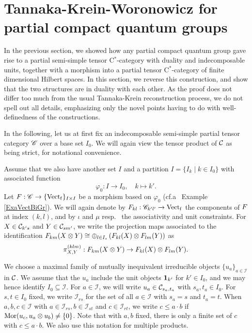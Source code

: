 \section{Tannaka-Krein-Woronowicz for partial compact quantum groups}


In the previous section, we showed how any partial compact quantum group gave rise to a partial semi-simple tensor C$^*$-category with duality and indecomposable units, together with a morphism into a partial tensor C$^*$-category of finite dimensional Hilbert spaces. In this section, we reverse this construction, and show that the two structures are in duality with each other. As the proof does not differ too much from the usual Tannaka-Krein reconstruction process, we do not spell out all details, emphasizing only the novel points having to do with well-definedness of the constructions.  %

In the following, let us at first fix an indecomposable semi-simple partial tensor category $\mathscr{C}$ over a base set $I_0$. We will again view the tensor product of $\mathcal{C}$ as being strict, for notational convenience. 

Assume that we also have another set $I$ and a partition $I = \{I_k\mid k\in I_0\}$ with associated function \[\varphi_0:I\rightarrow I_0, \quad k\mapsto k'.\] Let $F: \mathscr{C}\rightarrow \{\mathrm{Vect}_{\operatorname{\mathrm{f}}}\}_{I\times I}$ be a morphism based on $\varphi_0$ (cf.a~ Example \ref{ExaVectBiGr}).  We will again denote by $F_{kl}:\mathscr{C}_{k'l'}\rightarrow \mathrm{Vect}_{\operatorname{\mathrm{f}}}$ the components of $F$ at index $(k,l)$, and by $\iota$ and $\mu$ resp.~ the associativity and unit constraints.  For $X\in \mathcal{C}_{k's}$ and $Y\in \mathcal{C}_{sm'}$, we write the projection maps associated to the identification $F_{km}(X\otimes Y)\cong \oplus_{l\in I_s} \left(F_{kl}(X)\otimes F_{lm}(Y)\right)$ as \[\pi^{(klm)}_{X,Y}:F_{km}(X\otimes Y) \rightarrow F_{kl}(X)\otimes F_{lm}(Y).\]

We choose a maximal family of mutually inequivalent irreducible objects $\{u_a\}_{a\in \mathcal{I}}$ in $\mathcal{C}$. We assume that the $u_a$ include the unit objects $\mathbf{1}_{k'}$ for $k'\in I_0$, and we may hence identify $I_0\subseteq \mathcal{I}$. For $a\in \mathcal{I}$, we will write $u_a \in \mathcal{C}_{s_a,t_a}$ with $s_a,t_a\in I_0$. For $s,t\in I_0$ fixed, we write $\mathcal{I}_{rs}$ for the set of all $a\in \mathcal{I}$ with $s_a=s$ and $t_a=t$. When $a,b,c\in \mathcal{I}$ with $a\in \mathcal{I}_{rs},b\in \mathcal{I}_{st}$ and $c\in \mathcal{I}_{rt}$, we write $c\leq a\cdot b$ if $\mathrm{Mor}(u_c,u_a\otimes u_b)\neq \{0\}$. Note that with $a,b$ fixed, there is only a finite set of $c$ with $c\leq a\cdot b$. We also use this notation for multiple products.

